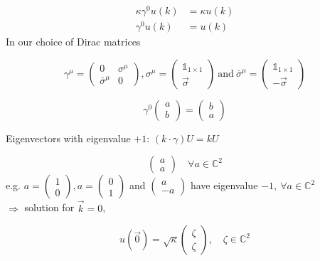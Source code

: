 \documentclass[11pt]{article}
\begin{document}
	\begin{align*}
		\kappa \gamma^0 u(k) &= \kappa u(k)\\
		\gamma^0 u(k) &= u(k)
	\end{align*}
	In our choice of Dirac matrices
	
	\[ \gamma^\mu = \begin{pmatrix}
		0 & \sigma^\mu \\
		\bar{\sigma}^\mu & 0
	\end{pmatrix}, \sigma^\mu = \begin{pmatrix}
	\mathbb{1}_{1\times 1} \\
			\vec{\sigma}
\end{pmatrix}\ 
		\text{and}\ \bar{\sigma}^\mu = \begin{pmatrix}
		\mathbb{1}_{1\times1}\\ -\vec{\sigma}
\end{pmatrix}\]
	
	\[ \gamma^0 \begin{pmatrix}
		a \\ b
	\end{pmatrix} = \begin{pmatrix}
	b \\ a
\end{pmatrix}\]
	
	Eigenvectors with eigenvalue $+1$: $(k\cdot \gamma)U = kU$
	
\[\begin{pmatrix}
		a \\ a
	\end{pmatrix} \quad \forall a\in \mathbb{C}^2
\]
e.g. $a= \begin{pmatrix}
	1 \\ 0
\end{pmatrix}, a= \begin{pmatrix}
0\\ 1
\end{pmatrix}$ and $\begin{pmatrix}
	a \\ -a 
\end{pmatrix}$ have eigenvalue $-1,\ \forall a\in\mathbb{C}^2$\\


$\Rightarrow$ solution for $\vec{k} = 0$,

\[	  u(\vec{0}) = \sqrt{\kappa}\begin{pmatrix}
	\zeta \\ \zeta
\end{pmatrix}, \quad \zeta \in \mathbb{C}^2	 \]
\end{document}
